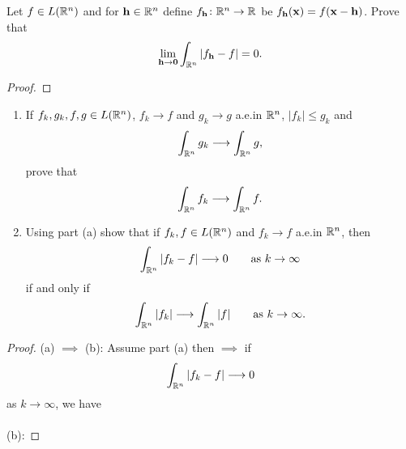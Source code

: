 \begin{problem}
Let $f\in L(\mathbb{R}^n)$ and for $\mathbf{h}\in\mathbb{R}^n$ define
$f_{\mathbf{h}}\colon\mathbb{R}^n\to\mathbb{R}$ be $f_{\mathbf{h}}(\mathbf{x})=
f(\mathbf{x}-\mathbf{h})$. Prove that
\[
\lim_{\mathbf{h}\to\mathbf{0}}\int_{\mathbb{R}^n}\left|f_{\mathbf{h}}-f\right|=0.
\]
\end{problem}
\begin{proof}
\end{proof}

\begin{problem}
\begin{enumerate}[label=(\alph*)]
\item If $f_k,g_k,f,g\in L(\mathbb{R}^n)$, $f_k\to f$ and $g_k\to g$ a.e.\@ in
  $\mathbb{R}^n$, $|f_k|\leq g_k$ and
\[
\int_{\mathbb{R}^n}g_k\longrightarrow\int_{\mathbb{R}^n}g,
\]
prove that
\[
\int_{\mathbb{R}^n} f_k\longrightarrow\int_{\mathbb{R}^n}f.
\]
\item Using part (a) show that if $f_k,f\in L(\mathbb{R}^n)$ and $f_k\to f$
  a.e.\@ in $\mathbb{R}^n$, then
\[
\int_{\mathbb{R}^n}|f_k-f|\longrightarrow 0\qquad\text{as $k\to\infty$}
\]
if and only if
\[
\int_{\mathbb{R}^n}|f_k|\longrightarrow\int_{\mathbb{R}^n}|f|\qquad\text{as $k\to\infty$}.
\]
\end{enumerate}
\end{problem}
\begin{proof}
(a) $\implies$ (b): Assume part (a) then $\implies$ if
\begin{equation}
\label{eq:prep:2:12}
\int_{\mathbb{R}^n}|f_k-f|\longrightarrow 0
\end{equation}
as $k\to\infty$, we have
\\\\
(b):
\end{proof}

